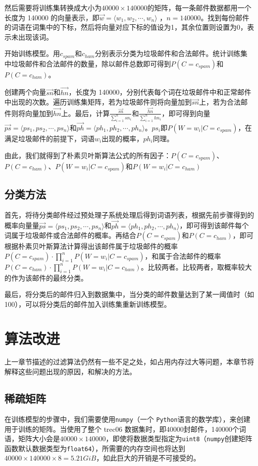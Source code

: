 \documentclass[UTF8,zihao=-4]{ctexart}
\begin{document}
	然后需要将训练集转换成大小为$40000 \times 140000$的矩阵，每一条邮件数据都用一个长度为 140000 的向量表示，即$\vec{w}=\langle w_1,w_2, \cdots ,w_n\rangle$ ，$n=140000$。找到每份邮件的词语在词集中的下标，然后将向量对应下标的值设为1，其余位置则设置为0，表示未出现该词。
	
	
	开始训练模型。用$c_{spam}$和$c_{ham}$分别表示分类为垃圾邮件和合法邮件。统计训练集中垃圾邮件和合法邮件的数量，除以邮件总数即可得到$P(C=c_{spam})$和$P(C=c_{ham})$。
	
	创建两个向量$\vec{sn}$和$\vec{hn}$，长度为 140000，分别代表每个词在垃圾邮件中和正常邮件中出现的次数。遍历训练集矩阵，若为垃圾邮件则将向量加到$\vec{sn}$上，若为合法邮件则将向量加到$\vec{hn}$上。最后，计算$\frac{\vec{sn}}{\sum_{i=1}^{n}sn_i}$和$\frac{\vec{hn}}{\sum_{i=1}^{n}hn_i}$，即可得到向量$\vec{ps}=\langle ps_1,ps_2,\cdots,ps_n\rangle$和$\vec{ph}=\langle ph_1,ph_2,\cdots,ph_n\rangle$。$ps_i$即$P(W=w_i|C=c_{spam})$，在满足垃圾邮件的前提下，词语$w_i$出现的概率，$ph_i$同理。
	
	由此，我们就得到了朴素贝叶斯算法公式的所有因子：$P(C=c_{spam})$、$P(C=c_{ham})$、$P(W=w_i|C=c_{spam})$和$P(W=w_i|C=c_{ham})$
	
\subsection{分类方法}
	首先，将待分类邮件经过预处理子系统处理后得到词语列表，根据先前步骤得到的概率向量量$\vec{ps}=\langle ps_1,ps_2,\cdots,ps_n\rangle$和$\vec{ph}=\langle ph_1,ph_2,\cdots,ph_n\rangle$，即可得到该邮件每个词属于垃圾邮件或合法邮件的概率。再结合$P(C=c_{spam})$和$P(C=c_{ham})$，即可根据朴素贝叶斯算法计算得出该邮件属于垃圾邮件的概率$P(C=c_{spam}) \cdot \prod\limits_{i=1}^{n} P(W=w_i|C=c_{spam})$，和属于合法邮件的概率$P(C=c_{ham}) \cdot \prod\limits_{i=1}^{n} P(W=w_i|C=c_{ham})$。比较两者。比较两者，取概率较大的作为该邮件的最终分类。
	
	最后，将分类后的邮件归入到数据集中，当分类的邮件数量达到了某一阈值时（如100），可以将分类后的邮件加入训练集重新训练模型。

\newpage
\section{算法改进}
	上一章节描述的过滤算法仍然有一些不足之处，如占用内存过大等问题，本章节将解释这些问题出现的原因，和解决的方法。
\subsection{稀疏矩阵}
	在训练模型的步骤中，我们需要使用\texttt{numpy}（一个 \texttt{Python}语言的数学库），来创建用于训练的矩阵。当使用了整个 trec06 数据集时，即40000封邮件，140000个词语，矩阵大小会是$40000\times140000$，即使将数据类型指定为\texttt{uint8}（\texttt{numpy}创建矩阵函数默认数据类型为\texttt{float64}），所需要的内存空间也将达到$40000\times140000\times8=5.21GiB$，如此巨大的开销是不可接受的。
	
\end{document}
